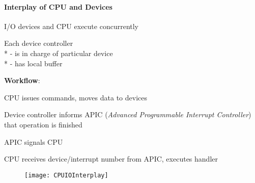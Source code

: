 \paragraph{Interplay of CPU and Devices}
\begin{items}
	\item I/O devices and CPU execute concurrently
	\item Each device controller \\*
		- is in charge of particular device \\*
		- has local buffer
	\item \textbf{Workflow}:
	\begin{enumeration}
		\item CPU issues commands, moves data to devices
		\item Device controller informs APIC (\emph{Advanced Programmable Interrupt Controller}) that operation is finished
		\item APIC signals CPU
		\item CPU receives device/interrupt number from APIC, executes handler
	\end{enumeration}
	\begin{figure}[H]\centering\label{CPUIOInterplay}\texttt{[image: CPUIOInterplay]}\end{figure}
\end{items}

\newpage 


